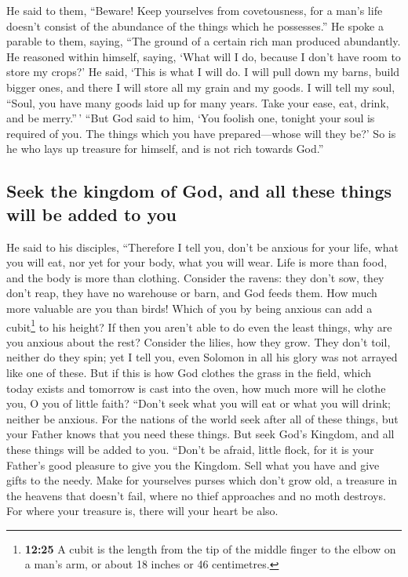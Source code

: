  He said to them, ``Beware! Keep yourselves from
covetousness, for a man's life doesn't consist of the abundance of the
things which he possesses.''  He spoke a parable to them,
saying, ``The ground of a certain rich man produced abundantly.
 He reasoned within himself, saying, `What will I do,
because I don't have room to store my crops?'  He said,
`This is what I will do. I will pull down my barns, build bigger ones,
and there I will store all my grain and my goods.  I will
tell my soul, ``Soul, you have many goods laid up for many years. Take
your ease, eat, drink, and be merry.''\,'  ``But God said
to him, `You foolish one, tonight your soul is required of you. The
things which you have prepared---whose will they be?'  So
is he who lays up treasure for himself, and is not rich towards God.''

\hypertarget{seek-the-kingdom-of-god-and-all-these-things-will-be-added-to-you}{%
\subsection{Seek the kingdom of God, and all these things will be added
to
you}\label{seek-the-kingdom-of-god-and-all-these-things-will-be-added-to-you}}

 He said to his disciples, ``Therefore I tell you, don't
be anxious for your life, what you will eat, nor yet for your body, what
you will wear.  Life is more than food, and the body is
more than clothing.  Consider the ravens: they don't sow,
they don't reap, they have no warehouse or barn, and God feeds them. How
much more valuable are you than birds!  Which of you by
being anxious can add a cubit\footnote{\textbf{12:25} A cubit is the
  length from the tip of the middle finger to the elbow on a man's arm,
  or about 18 inches or 46 centimetres.} to his height? 
If then you aren't able to do even the least things, why are you anxious
about the rest?  Consider the lilies, how they grow. They
don't toil, neither do they spin; yet I tell you, even Solomon in all
his glory was not arrayed like one of these.  But if this
is how God clothes the grass in the field, which today exists and
tomorrow is cast into the oven, how much more will he clothe you, O you
of little faith?  ``Don't seek what you will eat or what
you will drink; neither be anxious.  For the nations of
the world seek after all of these things, but your Father knows that you
need these things.  But seek God's Kingdom, and all these
things will be added to you.  ``Don't be afraid, little
flock, for it is your Father's good pleasure to give you the Kingdom.
 Sell what you have and give gifts to the needy. Make for
yourselves purses which don't grow old, a treasure in the heavens that
doesn't fail, where no thief approaches and no moth destroys.
 For where your treasure is, there will your heart be
also.

